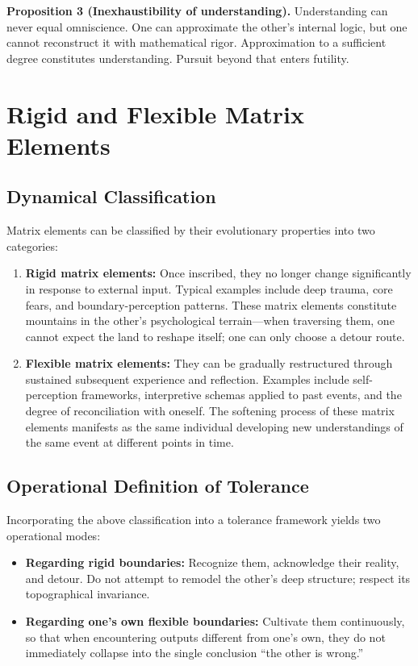 ﻿\documentclass[11pt,a4paper]{article}
\begin{document}
\textbf{Proposition 3 (Inexhaustibility of understanding).} Understanding can never equal omniscience. One can approximate the other's internal logic, but one cannot reconstruct it with mathematical rigor. Approximation to a sufficient degree constitutes understanding. Pursuit beyond that enters futility.

\section{Rigid and Flexible Matrix Elements}

\subsection{Dynamical Classification}

Matrix elements can be classified by their evolutionary properties into two categories:

\begin{enumerate}[label=(\arabic*)]
    \item \textbf{Rigid matrix elements:} Once inscribed, they no longer change significantly in response to external input. Typical examples include deep trauma, core fears, and boundary-perception patterns. These matrix elements constitute mountains in the other's psychological terrain---when traversing them, one cannot expect the land to reshape itself; one can only choose a detour route.
    \item \textbf{Flexible matrix elements:} They can be gradually restructured through sustained subsequent experience and reflection. Examples include self-perception frameworks, interpretive schemas applied to past events, and the degree of reconciliation with oneself. The softening process of these matrix elements manifests as the same individual developing new understandings of the same event at different points in time.
\end{enumerate}

\subsection{Operational Definition of Tolerance}

Incorporating the above classification into a tolerance framework yields two operational modes:

\begin{itemize}
    \item \textbf{Regarding rigid boundaries:} Recognize them, acknowledge their reality, and detour. Do not attempt to remodel the other's deep structure; respect its topographical invariance.
    \item \textbf{Regarding one's own flexible boundaries:} Cultivate them continuously, so that when encountering outputs different from one's own, they do not immediately collapse into the single conclusion ``the other is wrong.''
\end{itemize}
\end{document}
